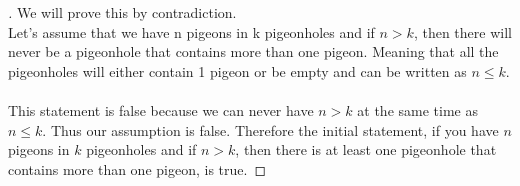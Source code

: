 \documentclass[12pt]{article}
\newenvironment{solution}[1][{\color{red} Solution:}]{\begin{trivlist}
\item[\hskip \labelsep {\bfseries #1}\hskip \labelsep {\bfseries}]}{\end{trivlist}}
\begin{document}
\begin{solution} 
        \begin{proof}[\unskip\nopunct]
            We will prove this by contradiction. \\Let's assume that we have n pigeons in k pigeonholes and if $n > k$, then there will never be a pigeonhole that contains more than one pigeon. Meaning that all the pigeonholes will either contain 1 pigeon or be empty and can be written as $n \leq k$.\\ \\This statement is false because we can never have $n > k$ at the same time as $  n \leq k$. Thus our assumption is false. Therefore the initial statement, if you have $n$ pigeons in $k$ pigeonholes and if $n>k$, then there is at least one pigeonhole that contains more than one pigeon, is true.
         
        \end{proof}
    \end{solution}

\clearpage

\end{document}
